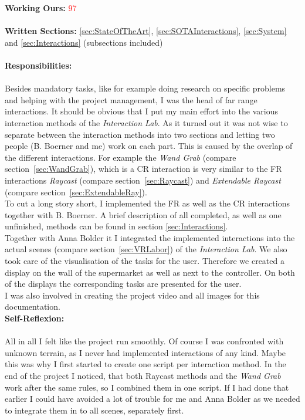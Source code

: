 \textbf{Working Ours:} \textcolor{red}{97} \\ \\
\textbf{Written Sections:} \ref{sec:StateOfTheArt},  \ref{sec:SOTAInteractions}, \ref{sec:System} and \ref{sec:Interactions} (subsections included) \\ \\
\textbf{Responsibilities:}\\ \\
Besides mandatory tasks, like for example doing research on specific problems and helping with the project management, I was the head of far range interactions. It should  be obvious that I put my main effort into the various interaction methods of the \textit{Interaction Lab}. As it turned out it was not wise to separate between the interaction methods into two sections and letting two people (B. Boerner and me) work on each part. This is caused by the overlap of the different interactions. For example the \textit{Wand Grab} (compare section~\ref{sec:WandGrab}), which is a CR interaction is very similar to the FR interactions \textit{Raycast} (compare section~\ref{sec:Raycast}) and \textit{Extendable Raycast} (compare section~\ref{sec:ExtendableRay}). \\
To cut a long story short, I implemented the FR as well as the CR interactions together with B. Boerner. A brief description of all completed, as well as one unfinished, methods can be found in section \ref{sec:Interactions}.\\
Together with Anna Bolder it I integrated the implemented interactions into the actual scenes (compare section~\ref{sec:VRLabor}) of the \textit{Interaction Lab}. We also took care of the visualisation of the tasks for the user. Therefore we created a display on the wall of the supermarket as well as next to the controller. On both of the displays the corresponding tasks are presented for the user. \\
I was also involved in creating the project video and all images for this documentation.\\

\textbf{Self-Reflexion:}\\ \\
All in all I felt like the project run smoothly. Of course I was confronted with unknown terrain, as I never had implemented interactions of any kind. Maybe this was why I first started to create one script per interaction method. In the end of the project I noticed, that both Raycast methods and the \textit{Wand Grab} work after the same rules, so I combined them in one script. If I had done that earlier I could have avoided a lot of trouble for me and Anna Bolder as we needed to integrate them in to all scenes, separately first.

\newpage

























